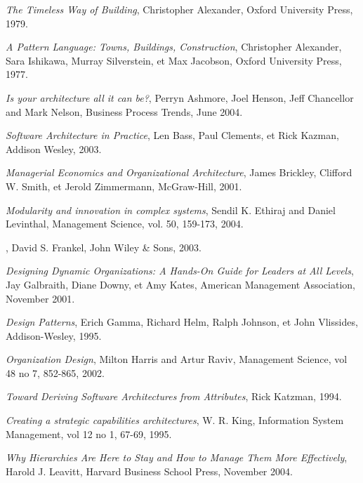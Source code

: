 \documentclass[11pt,english,a4]{article}
\begin{document}
\begin{thebibliography}{99}

 {\emph{The Timeless Way of Building}}, Christopher Alexander, Oxford University Press, 1979.

  {\emph{A Pattern Language: Towns, Buildings, Construction}}, Christopher Alexander, Sara Ishikawa, Murray Silverstein, et Max Jacobson, Oxford University Press, 1977.

  {\emph{Is your architecture all it can be?}}, 
Perryn Ashmore, Joel Henson, Jeff Chancellor and Mark Nelson, Business Process Trends, June 2004.

  {\emph{Software Architecture in Practice}}, Len Bass, Paul Clements, et Rick Kazman, Addison Wesley, 2003.

  {\emph{Managerial Economics and Organizational Architecture}}, 
	James Brickley, Clifford W. Smith, et Jerold Zimmermann, McGraw-Hill, 2001.

  {\emph{Modularity and innovation in complex systems}}, Sendil K. Ethiraj and
Daniel Levinthal, Management Science, vol. 50, 159-173, 2004.

, David S. Frankel, John Wiley \& Sons, 2003.

  {\emph{Designing Dynamic Organizations: A Hands-On Guide for Leaders at All Levels}}, 
	Jay Galbraith, Diane Downy, et Amy Kates, American Management Association, November 2001.

  {\emph{Design Patterns}}, 
  Erich Gamma, Richard Helm, Ralph Johnson, et John Vlissides, Addison-Wesley, 1995.

  {\emph{Organization Design}}, Milton Harris and Artur Raviv, Management Science,
  vol 48 no 7, 852-865, 2002.

  {\emph{Toward Deriving Software Architectures from Attributes}}, Rick Katzman, 1994.

  {\emph{Creating a strategic capabilities architectures}}, W. R. King,
  Information System Management, vol 12 no 1, 67-69, 1995.

  {\emph{Why Hierarchies Are Here to Stay and How to Manage Them More Effectively}}, 
  Harold J. Leavitt, Harvard Business School Press, November 2004.


\end{thebibliography}
\end{document}
